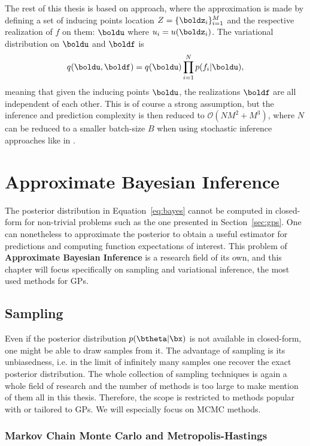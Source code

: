 The rest of this thesis is based on \citet{Titsias2009} approach, where the approximation is made by defining a set of inducing points location $Z=\{\boldz_i\}_{i=1}^M$ and the respective realization of $f$ on them: $\boldu$ where $u_i = u(\boldz_i)$.
The variational distribution on $\boldu$ and $\boldf$ is
\begin{align}
    q(\boldu,\boldf) = q(\boldu)\prod_{i=1}^N p(f_i|\boldu),
    \label{eq:titsias_assumption}
\end{align}
meaning that given the inducing points $\boldu$, the realizations $\boldf$ are all independent of each other.
This is of course a strong assumption, but the inference and prediction complexity is then reduced to $\mathcal{O}(NM^2 + M^3)$, where $N$ can be reduced to a smaller batch-size $B$ when using stochastic inference approaches like in \cite{Hensman2013,Hensman2015}.

\section{Approximate Bayesian Inference}
\label{sec:approx_inf}
The posterior distribution in Equation~\eqref{eq:bayes} cannot be computed in closed-form for non-trivial problems such as the one presented in Section~\ref{sec:gps}.
One can nonetheless to approximate the posterior to obtain a useful estimator for predictions and computing function expectations of interest.
This problem of \textbf{Approximate Bayesian Inference} is a research field of its own, and this chapter will focus specifically on sampling and variational inference, the most used methods for \ac{GPs}.

\subsection{Sampling}

Even if the posterior distribution $p(\btheta|\bx)$ is not available in closed-form, one might be able to draw samples from it.
The advantage of sampling is its unbiasedness, i.e. in the limit of infinitely many samples one recover the exact posterior distribution.
The whole collection of sampling techniques is again a whole field of research and the number of methods is too large to make mention of them all in this thesis.
Therefore, the scope is restricted to methods popular with or tailored to \ac{GPs}.
We will especially focus on \ac{MCMC} methods.
\subsubsection{Markov Chain Monte Carlo and Metropolis-Hastings}

